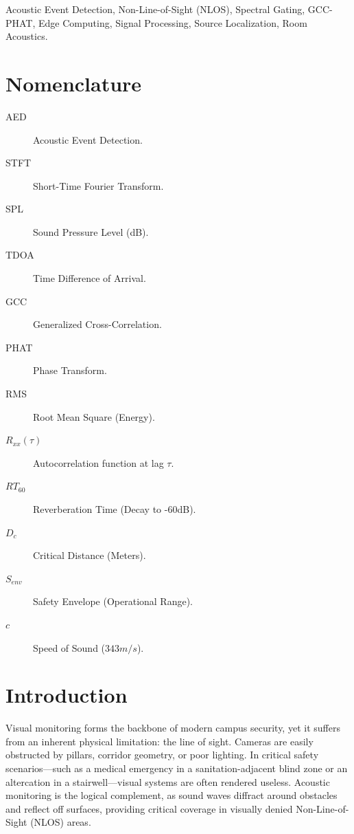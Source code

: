 \documentclass[conference]{IEEEtran}
\begin{document}
\begin{IEEEkeywords}
Acoustic Event Detection, Non-Line-of-Sight (NLOS), Spectral Gating, GCC-PHAT, Edge Computing, Signal Processing, Source Localization, Room Acoustics.
\end{IEEEkeywords}

\section*{Nomenclature}
\begin{description}
    \item[AED] Acoustic Event Detection.
    \item[STFT] Short-Time Fourier Transform.
    \item[SPL] Sound Pressure Level (dB).
    \item[TDOA] Time Difference of Arrival.
    \item[GCC] Generalized Cross-Correlation.
    \item[PHAT] Phase Transform.
    \item[RMS] Root Mean Square (Energy).
    \item[$R_{xx}(\tau)$] Autocorrelation function at lag $\tau$.
    \item[$RT_{60}$] Reverberation Time (Decay to -60dB).
    \item[$D_c$] Critical Distance (Meters).
    \item[$S_{env}$] Safety Envelope (Operational Range).
    \item[$c$] Speed of Sound ($343 m/s$).
\end{description}

\section{Introduction}
Visual monitoring forms the backbone of modern campus security, yet it suffers from an inherent physical limitation: the line of sight. Cameras are easily obstructed by pillars, corridor geometry, or poor lighting. In critical safety scenarios—such as a medical emergency in a sanitation-adjacent blind zone or an altercation in a stairwell—visual systems are often rendered useless. Acoustic monitoring is the logical complement, as sound waves diffract around obstacles and reflect off surfaces, providing critical coverage in visually denied Non-Line-of-Sight (NLOS) areas.
\end{document}
